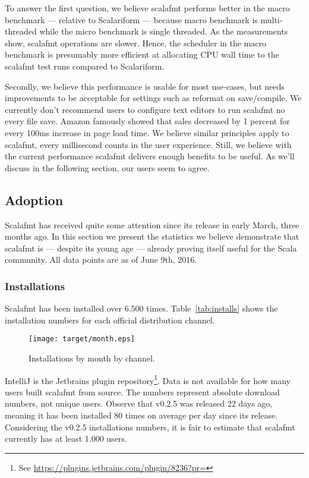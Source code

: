 To answer the first question, we believe scalafmt performs better in the macro benchmark --- relative to Scalariform --- because macro benchmark is multi-threaded while the micro benchmark is single threaded.
As the measurements show, scalafmt operations are slower.
Hence, the scheduler in the macro benchmark is presumably more efficient at allocating CPU wall time to the scalafmt test runs compared to Scalariform.

Secondly, we believe this performance is usable for most use-cases, but needs improvements to be acceptable for settings such as reformat on save/compile.
We currently don't recommend users to configure text editors to run scalafmt no every file save.
Amazon famously showed that sales decreased by 1 percent for every 100ms increase in page load time\autocite{kohavi2007online}.
We believe similar principles apply to scalafmt, every millisecond counts in the user experience.
Still, we believe with the current performance scalafmt delivers enough benefits to be useful.
As we'll discuss in the following section, our users seem to agree.

\subsection{Adoption}\label{sec:adoption}
Scalafmt has received quite some attention since its release in early March, three months ago.
In this section we present the statistics we believe demonstrate that scalafmt is --- despite its young age --- already proving itself useful for the Scala community.
All data points are as of June 9th, 2016.

\subsubsection{Installations}
Scalafmt has been installed over 6.500 times.
  Table~\ref{tab:installs} shows the installation numbers for each official distribution channel.
  \begin{figure}
    \CenterFloatBoxes
    \begin{floatrow}
      \ffigbox
      {\texttt{[image: target/month.eps]}}
      {\caption{Installations by month by channel.}\label{fig:installs}}
      \killfloatstyle
    \end{floatrow}
  \end{figure}
IntelliJ is the Jetbrains plugin repository\footnote{
  See \url{https://plugins.jetbrains.com/plugin/8236?pr=}
}.
Data is not available for how many users built scalafmt from source.
The numbers represent absolute download numbers, not unique users.
Observe that v0.2.5 was released 22 days ago, meaning it has been installed 80 times on average per day since its release.
Considering the v0.2.5 installations numbers, it is fair to estimate that scalafmt currently has at least 1.000 users.

